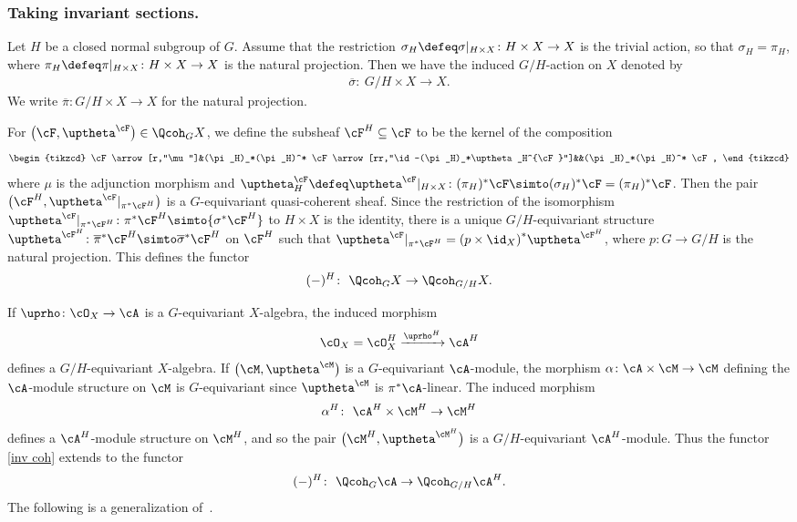 \subsubsection{Taking invariant sections.}
Let $H$ be a closed normal subgroup of $G$. Assume that the restriction $\sigma_H\defeq\sigma|_{H\times X}\colon H\times X\to X$ is the trivial action, so that $\sigma_H=\pi_H$, where $\pi_H\defeq\pi|_{H\times X}\colon H\times X\to X$ is the natural projection. Then we have the induced $G/H$-action on $X$ denoted by
\begin{gather*}
\overline{\sigma}\colon\ G/H\times X\to X.
\end{gather*}
We write $\overline{\pi}\colon G/H\times X\to X$ for the natural projection.

For $\big(\cF,\uptheta^{\cF}\big)\in\Qcoh_GX$, we define the subsheaf $\cF^H\subseteq\cF$ to be the kernel of the composition
\[
\begin{tikzcd}
\cF\arrow[r,"\mu"]&(\pi_H)_*(\pi_H)^* \cF\arrow[rr,"\id -(\pi_H)_*\uptheta_H^{\cF}"]&&(\pi_H)_*(\pi_H)^* \cF,
\end{tikzcd}
\]
 where $\mu$ is the adjunction morphism and $\uptheta^{\cF}_H\defeq\uptheta^{\cF}|_{H\times X}\colon (\pi_H)^*\cF\simto (\sigma_H)^*\cF=(\pi_H)^*\cF$.
Then the pair $\big(\cF^H,\uptheta^{\cF}|_{\pi^*\cF^H}\big)$ is a $G$-equivariant quasi-coherent sheaf. Since the restriction of the isomorphism $\uptheta^{\cF}|_{\pi^*\cF^H}\colon {\pi^*\cF^H}\simto {\sigma^*\cF^H}$ to $H\times X$ is the identity, there is a unique $G/H$-equivariant structure $\uptheta^{\cF^H}\colon \overline{\pi}^*\cF^H\simto \overline{\sigma}^*\cF^H$ on $\cF^H$ such that $\uptheta^{\cF}|_{\pi^*\cF^H}={(p\times \id _X)}^*\uptheta^{\cF^H}$, where $p\colon G\to G/H$ is the natural projection. This defines the functor
\begin{equation}\label{inv coh}
(-)^H\colon\ \Qcoh_GX\to \Qcoh_{G/H}X.
\end{equation}

If $\uprho\colon\cO_X\to\cA$ is a $G$-equivariant $X$-algebra, the induced morphism
\begin{gather*}
\cO_X=\cO_X^H\xrightarrow{\uprho^H}\cA^H
\end{gather*}
defines a $G/H$-equivariant $X$-algebra. If $\big(\cM,\uptheta^{\cM}\big)$ is a $G$-equivariant $\cA$-module, the morphism $\alpha\colon \cA\times \cM\to \cM$ defining the $\cA$-module structure on $\cM$ is $G$-equivariant since $\uptheta^{\cM}$ is $\pi^*\cA$-linear. The induced morphism
\begin{gather*}
\alpha^H\colon\ \cA^H\times \cM^H\to \cM^H
\end{gather*}
 defines a $\cA^H$-module structure on $\cM^H$, and so the pair $\big(\cM^H,\uptheta^{\cM^H}\big)$ is a $G/H$-equivariant $\cA^H$-module. Thus the functor \eqref{inv coh} extends to the functor
\begin{gather*}
(-)^H\colon\ \Qcoh_G\cA\to \Qcoh_{G/H}\cA^H.
\end{gather*}
The following is a generalization of~\cite[Lemma~2.22]{bfk}.

